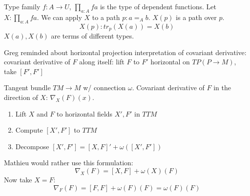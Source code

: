 \documentclass[12pt,fleqn]{article}
\begin{document}
Type family \( f:A\to U \), \( \prod_{a:A}fa \) is the type of dependent functions. Let \( X:\prod_{a:A}fa \). We can apply \( X \) to a path \( p:a=_A b \). \( X(p) \) is a path over \( p \).
\[ 
X(p):tr_p(X(a))=X(b) 
\]
\( X(a), X(b) \) are terms of different types.

Greg reminded about horizontal projection interpretation of covariant derivative: covariant derivative of \( F \) along itself: lift \( F \) to \( F' \) horizontal on \( TP (P\to M) \), take \( [F', F'] \)

Tangent bundle \( TM\to M \) w/ connection \( \omega \). Covariant derivative of \( F \) in the direction of \( X \): \( \nabla_X(F)(x) \). 
\begin{enumerate}
\item Lift \( X \) and \( F \) to horizontal fields \( X', F' \) in \( TTM \)
\item Compute \( [X', F'] \) to \( TTM \)
\item Decompose \( [X', F'] = [X, F]' + \omega([X', F']) \)
\end{enumerate}

Mathieu would rather use this formulation:
\[ 
\nabla_X(F) = [X, F] + \omega(X)(F) 
\]
Now take \( X=F \):
\[ 
\nabla_F(F) = [F, F] + \omega(F)(F) = \omega(F)(F) 
\]

\clearpage

\clearpage

\clearpage

\clearpage

\clearpage

\clearpage
% 


\end{document}

